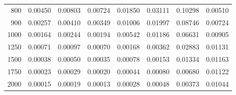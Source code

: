 \begin{table}[ht]
\begin{tabular}{r|c|c|c|c|c|c|c}
      800 & 0.00450 & 0.00803 & 0.00724 & 0.01850 & 0.03111 & 0.10298 & 0.00510 \\
      900 & 0.00257 & 0.00410 & 0.00349 & 0.01006 & 0.01997 & 0.08746 & 0.00724 \\
     1000 & 0.00164 & 0.00244 & 0.00194 & 0.00542 & 0.01186 & 0.06631 & 0.00905 \\
     1250 & 0.00071 & 0.00097 & 0.00070 & 0.00168 & 0.00362 & 0.02883 & 0.01131 \\
     1500 & 0.00038 & 0.00050 & 0.00035 & 0.00078 & 0.00153 & 0.01334 & 0.01163 \\
     1750 & 0.00023 & 0.00029 & 0.00020 & 0.00044 & 0.00080 & 0.00680 & 0.01122 \\
     2000 & 0.00015 & 0.00019 & 0.00013 & 0.00028 & 0.00048 & 0.00373 & 0.01044 \\ \cline{1-8}
    \end{tabular}
    \label{tab:XRayEffOCX4}
\end{table}

